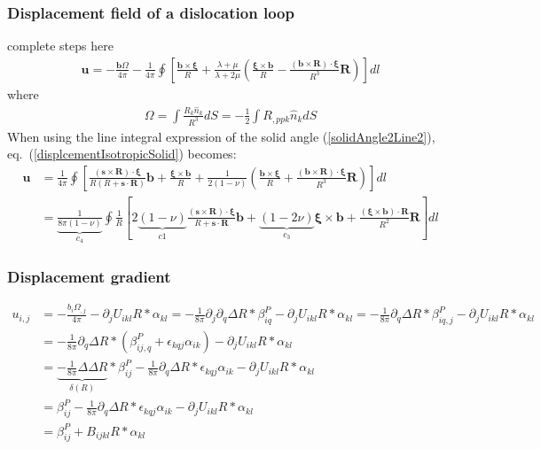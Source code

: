 \documentclass[10pt]{report}
\begin{document}
{\subsubsection{Displacement field of a dislocation loop}
complete steps here
\begin{align}
\bm u=-\frac{\bm b\Omega}{4\pi}-\frac{1}{4\pi}\oint\left[\frac{\bm b\times\bm \xi}{R}+\frac{\lambda+\mu}{\lambda+2\mu}\left(\frac{\bm \xi\times\bm b}{R}-\frac{(\bm b\times\bm R)\cdot\bm \xi}{R^3}\bm R\right)\right]dl
\label{displcementIsotropicSolid}
\end{align}
where 
\begin{align}
\Omega=\int\frac{R_k\hat{n}_k}{R^3}dS=-\frac{1}{2}\int R_{,ppk}\hat{n}_kdS
\end{align}
When using the line integral expression of the solid angle (\ref{solidAngle2Line2}), eq.~(\ref{displcementIsotropicSolid}) becomes:
\begin{align}
\bm u&=\frac{1}{4\pi}\oint\left[\frac{(\bm s\times\bm R)\cdot\bm\xi}{R(R+\bm s\cdot\bm R)}\bm b+\frac{\bm \xi\times\bm b}{R}+\frac{1}{2(1-\nu)}\left(\frac{\bm b\times \bm \xi}{R}+\frac{(\bm b\times\bm R)\cdot\bm \xi}{R^3}\bm R\right)\right]dl\nonumber\\
&=\underbrace{\frac{1}{8\pi(1-\nu)}}_{c_4}\oint\frac{1}{R}\left[2\underbrace{(1-\nu)}_{c1}\frac{(\bm s\times\bm R)\cdot\bm\xi}{R+\bm s\cdot\bm R}\bm b+\underbrace{(1-2\nu)}_{c_3}\bm \xi\times\bm b+\frac{(\bm \xi\times\bm b)\cdot\bm R}{R^2}\bm R\right]dl
\label{displcementIsotropicLine}
\end{align}
\subsubsection{Displacement gradient}

\begin{align}
u_{i,j}&=-\frac{b_i\Omega_{,j}}{4\pi}-\partial_jU_{ikl} R * \alpha_{kl}
=-\frac{1}{8\pi}\partial_j\partial_q\Delta R* \beta^P_{iq}-\partial_jU_{ikl} R * \alpha_{kl}
=-\frac{1}{8\pi}\partial_q\Delta R* \beta^P_{iq,j}-\partial_jU_{ikl} R * \alpha_{kl}\nonumber\\
&=-\frac{1}{8\pi}\partial_q\Delta R*\left( \beta^P_{ij,q}+\epsilon_{kqj}\alpha_{ik}\right)-\partial_jU_{ikl} R * \alpha_{kl}\nonumber\\
&=\underbrace{-\frac{1}{8\pi}\Delta\Delta R}_{\delta(R)}* \beta^P_{ij}-\frac{1}{8\pi}\partial_q\Delta R*\epsilon_{kqj}\alpha_{ik}-\partial_jU_{ikl} R * \alpha_{kl}\nonumber\\
&=\beta^P_{ij}-\frac{1}{8\pi}\partial_q\Delta R*\epsilon_{kqj}\alpha_{ik}-\partial_jU_{ikl} R * \alpha_{kl}\nonumber\\
&=\beta^P_{ij}+B_{ijkl}R*\alpha_{kl}
\end{align}

}
\end{document}
